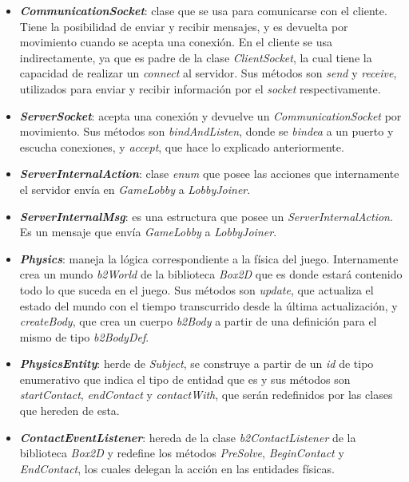 \begin{itemize}
	\item \textbf{\textit{CommunicationSocket}}: clase que se usa para comunicarse con el cliente. Tiene la posibilidad de enviar y recibir mensajes, y es devuelta por movimiento cuando se acepta una conexión. En el cliente se usa indirectamente, ya que es padre de la clase \textit{ClientSocket}, la cual tiene la capacidad de realizar un \textit{connect} al servidor. Sus métodos son \textit{send} y \textit{receive}, utilizados para enviar y recibir información por el \textit{socket} respectivamente.
	
	\item \textbf{\textit{ServerSocket}}: acepta una conexión y devuelve un \textit{CommunicationSocket} por movimiento. Sus métodos son \textit{bindAndListen}, donde se \textit{bindea} a un puerto y escucha conexiones, y \textit{accept}, que hace lo explicado anteriormente.
	
	\item \textbf{\textit{ServerInternalAction}}: clase \textit{enum} que posee las acciones que internamente el servidor envía en \textit{GameLobby} a \textit{LobbyJoiner}.
	
	\item \textbf{\textit{ServerInternalMsg}}: es una estructura que posee un \textit{ServerInternalAction}. Es un mensaje que envía \textit{GameLobby} a \textit{LobbyJoiner}.
	
	\item \textbf{\textit{Physics}}: maneja la lógica correspondiente a la física del juego. Internamente crea un mundo \textit{b2World} de la biblioteca \textit{Box2D} que es donde estará contenido todo lo que suceda en el juego. Sus métodos son \textit{update}, que actualiza el estado del mundo con el tiempo transcurrido desde la última actualización, y \textit{createBody}, que crea un cuerpo \textit{b2Body} a partir de una definición para el mismo de tipo \textit{b2BodyDef}.
	
	\item \textbf{\textit{PhysicsEntity}}: herde de \textit{Subject}, se construye a partir de un \textit{id} de tipo enumerativo que indica el tipo de entidad que es y sus métodos son \textit{startContact}, \textit{endContact} y \textit{contactWith}, que serán redefinidos por las clases que hereden de esta.
	
	\item \textbf{\textit{ContactEventListener}}: hereda de la clase \textit{b2ContactListener} de la biblioteca \textit{Box2D} y redefine los métodos \textit{PreSolve}, \textit{BeginContact} y \textit{EndContact}, los cuales delegan la acción en las entidades físicas.
	

\end{itemize}
